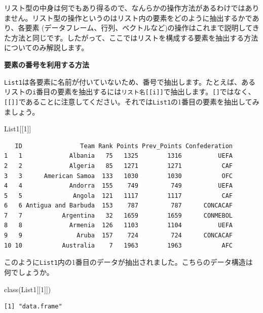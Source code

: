 \documentclass[
  a4paper,
  pandoc,
  ja=standard,
  jafont=haranoaji]{bxjsbook}
\newenvironment{Shaded}{\begin{snugshade}}{\end{snugshade}}
\newcommand{\DecValTok}[1]{\textcolor[rgb]{0.68,0.00,0.00}{#1}}
\newcommand{\FunctionTok}[1]{\textcolor[rgb]{0.28,0.35,0.67}{#1}}
\newcommand{\NormalTok}[1]{\textcolor[rgb]{0.00,0.48,0.65}{#1}}
\begin{document}
リスト型の中身は何でもあり得るので、なんらかの操作方法があるわけではありません。リスト型の操作というのはリスト内の要素をどのように抽出するかであり、各要素
(データフレーム、行列、ベクトルなど)の操作はこれまで説明してきた方法と同じです。したがって、ここではリストを構成する要素を抽出する方法についてのみ解説します。

\textbf{要素の番号を利用する方法}

\texttt{List1}は各要素に名前が付いていないため、番号で抽出します。たとえば、あるリストの\texttt{i}番目の要素を抽出するには\texttt{リスト名{[}{[}i{]}{]}}で抽出します。\texttt{{[}{]}}ではなく、\texttt{{[}{[}{]}{]}}であることに注意してください。それでは\texttt{List1}の1番目の要素を抽出してみましょう。

\begin{Shaded}
\begin{Highlighting}[numbers=left,,]
\NormalTok{List1[[}\DecValTok{1}\NormalTok{]]}
\end{Highlighting}
\end{Shaded}

\begin{verbatim}
   ID                Team Rank Points Prev_Points Confederation
1   1             Albania   75   1325        1316          UEFA
2   2             Algeria   85   1271        1271           CAF
3   3      American Samoa  133   1030        1030           OFC
4   4             Andorra  155    749         749          UEFA
5   5              Angola  121   1117        1117           CAF
6   6 Antigua and Barbuda  153    787         787      CONCACAF
7   7           Argentina   32   1659        1659      CONMEBOL
8   8             Armenia  126   1103        1104          UEFA
9   9               Aruba  157    724         724      CONCACAF
10 10           Australia    7   1963        1963           AFC
\end{verbatim}

このように\texttt{List1}内の1番目のデータが抽出されました。こちらのデータ構造は何でしょうか。

\begin{Shaded}
\begin{Highlighting}[numbers=left,,]
\FunctionTok{class}\NormalTok{(List1[[}\DecValTok{1}\NormalTok{]])}
\end{Highlighting}
\end{Shaded}

\begin{verbatim}
[1] "data.frame"
\end{verbatim}
\end{document}
